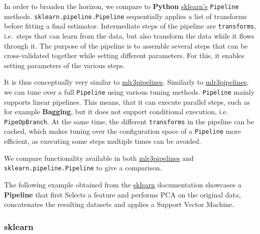 \documentclass[]{scrbook}
\begin{document}
In order to broaden the horizon, we compare to \textbf{Python} \href{https://scikit-learn.org/stable/}{sklearn's} \texttt{Pipeline} methods.
\texttt{sklearn.pipeline.Pipeline} sequentially applies a list of transforms before fitting a final estimator.
Intermediate steps of the pipeline are \texttt{transforms}, i.e.~steps that can learn from the data, but also transform the data while it flows through it.
The purpose of the pipeline is to assemble several steps that can be cross-validated together while setting different parameters.
For this, it enables setting parameters of the various steps.

It is thus conceptually very similar to \href{https://cran.r-project.org/package=mlr3pipelines}{mlr3pipelines}.
Similarly to \href{https://cran.r-project.org/package=mlr3pipelines}{mlr3pipelines}, we can tune over a full \texttt{Pipeline} using various tuning methods.
\texttt{Pipeline} mainly supports linear pipelines.
This means, that it can execute parallel steps, such as for example \textbf{Bagging}, but it does not support conditional execution, i.e. \texttt{PipeOpBranch}.
At the same time, the different \texttt{transforms} in the pipeline can be cached, which makes tuning over the configuration space of a \texttt{Pipeline} more efficient, as executing some steps multiple times can be avoided.

We compare functionality available in both \href{https://cran.r-project.org/package=mlr3pipelines}{mlr3pipelines} and \texttt{sklearn.pipeline.Pipeline} to give a comparison.

The following example obtained from the \href{https://scikit-learn.org/stable/}{sklearn} documentation showcases a \textbf{Pipeline} that first Selects a feature and performs PCA on the original data, concatenates the resulting datasets and applies a Support Vector Machine.

\hypertarget{sklearn}{%
\subsubsection{sklearn}\label{sklearn}}
\end{document}
